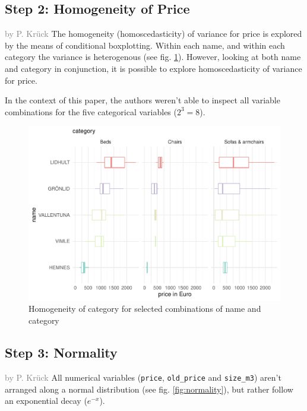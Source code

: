 \documentclass[a4paper, nobind]{templates/ociamthesis}
\begin{document}
\hypertarget{step-2-homogeneity-of-price}{%
\subsection{Step 2: Homogeneity of Price}\label{step-2-homogeneity-of-price}}

\textcolor{gray}{by P. Krück}
The homogeneity (homoscedasticity) of variance for price is explored by the means of conditional boxplotting.
Within each name, and within each category the variance is heterogenous (see fig. \ref{fig:homogeneity}). However, looking at both name and category in conjunction, it is possible to explore homoscedasticity of variance for price.

In the context of this paper, the authors weren't able to inspect all variable combinations for the five categorical variables (\(2^3=8\)).

\begin{figure}[!h]
\includegraphics[width=1\linewidth]{_main_files/figure-latex/homogeneity-1} \caption{Homogeneity of category for selected combinations of name and category}\label{fig:homogeneity}
\end{figure}

\hypertarget{step-3-normality}{%
\subsection{Step 3: Normality}\label{step-3-normality}}

\textcolor{gray}{by P. Krück}
All numerical variables (\texttt{price}, \texttt{old\_price} and \texttt{size\_m3}) aren't arranged along a normal distribution (see fig. \ref{fig:normality}), but rather follow an exponential decay (\(e^{-x}\)).
\end{document}
